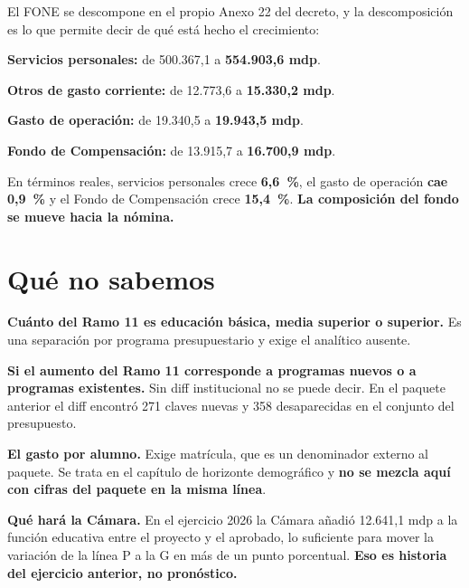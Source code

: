 El FONE se descompone en el propio Anexo 22 del decreto, y la descomposición es lo que
permite decir de qué está hecho el crecimiento:

\begin{list}{}{\setlength{\leftmargin}{1.4em}\setlength{\itemsep}{2pt}}
\item[$\bullet$] \textbf{Servicios personales:} de 500.367,1 a \textbf{554.903,6 mdp}.
\item[$\bullet$] \textbf{Otros de gasto corriente:} de 12.773,6 a \textbf{15.330,2 mdp}.
\item[$\bullet$] \textbf{Gasto de operación:} de 19.340,5 a \textbf{19.943,5 mdp}.
\item[$\bullet$] \textbf{Fondo de Compensación:} de 13.915,7 a \textbf{16.700,9 mdp}.
\end{list}

En términos reales, servicios personales crece \textbf{6,6~\%}, el gasto de operación
\textbf{cae 0,9~\%} y el Fondo de Compensación crece \textbf{15,4~\%}. \textbf{La
composición del fondo se mueve hacia la nómina.}

\section{Qué no sabemos}

\begin{list}{}{\setlength{\leftmargin}{1.4em}\setlength{\itemsep}{2pt}}
\item[$\bullet$] \textbf{Cuánto del Ramo 11 es educación básica, media superior o superior.}
Es una separación por programa presupuestario y exige el analítico ausente.
\item[$\bullet$] \textbf{Si el aumento del Ramo 11 corresponde a programas nuevos o a
programas existentes.} Sin diff institucional no se puede decir. En el paquete anterior el
diff encontró 271 claves nuevas y 358 desaparecidas en el conjunto del presupuesto.
\item[$\bullet$] \textbf{El gasto por alumno.} Exige matrícula, que es un denominador
externo al paquete. Se trata en el capítulo de horizonte demográfico y \textbf{no se mezcla
aquí con cifras del paquete en la misma línea}.
\item[$\bullet$] \textbf{Qué hará la Cámara.} En el ejercicio 2026 la Cámara añadió
12.641,1 mdp a la función educativa entre el proyecto y el aprobado, lo suficiente para
mover la variación de la línea P a la G en más de un punto porcentual. \textbf{Eso es
historia del ejercicio anterior, no pronóstico.}
\end{list}

